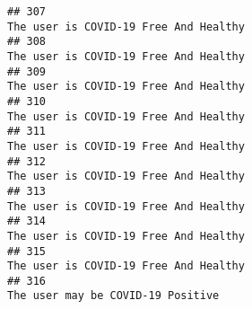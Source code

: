 \documentclass[
]{article}
\begin{document}
\begin{verbatim}
## 307                                                                                                                                                                                                                              The user is COVID-19 Free And Healthy
## 308                                                                                                                                                                                                                              The user is COVID-19 Free And Healthy
## 309                                                                                                                                                                                                                              The user is COVID-19 Free And Healthy
## 310                                                                                                                                                                                                                              The user is COVID-19 Free And Healthy
## 311                                                                                                                                                                                                                              The user is COVID-19 Free And Healthy
## 312                                                                                                                                                                                                                              The user is COVID-19 Free And Healthy
## 313                                                                                                                                                                                                                              The user is COVID-19 Free And Healthy
## 314                                                                                                                                                                                                                              The user is COVID-19 Free And Healthy
## 315                                                                                                                                                                                                                              The user is COVID-19 Free And Healthy
## 316                                                                                                                                                                                                                                  The user may be COVID-19 Positive

\end{verbatim}
\end{document}
